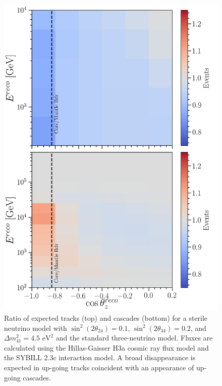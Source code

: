 \documentclass[main.tex]{subfiles}
\begin{document}
\begin{figure}
    \centering
    \includegraphics[width=0.95\linewidth]{figures/event_rate_ratios.png}
    \caption{Ratio of expected tracks (top) and cascades (bottom) for a sterile neutrino model with $\sin^{2}(2\theta_{24})=0.1$, $\sin^{2}(2\theta_{34})=0.2$, and $\Delta m_{41}^{2}=4.5\text{ eV}^{2}$ and the standard three-neutrino model. Fluxes are calculated using the Hillas-Gaisser H3a cosmic ray flux model and the SYBILL 2.3c interaction model. A broad disappearance is expected in up-going tracks coincident with an appearance of up-going cascades.}
    \label{fig:appear}
\end{figure}
\end{document}
